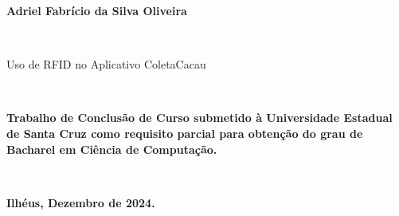 
%
% 
%
\begin{folhadeaprovacao}
\begin{center}
    {\large \begin{large} \bfseries Adriel Fabrício da Silva Oliveira \end{large}\\}
    \vspace{4cm}
    {\large\bfseries{\begin{large}Uso de RFID no Aplicativo ColetaCacau \end{large}}\\}
    \vspace{1cm}
    \hspace{.45\linewidth}
    \begin{minipage}{.50\linewidth}

            \textbf{Trabalho de Conclusão de Curso submetido à Universidade Estadual de Santa Cruz  como requisito parcial 
            para obtenção do grau de Bacharel em Ciência de Computação. }
    \end{minipage}
    \\
\end{center}
    \textbf{Ilhéus, Dezembro de 2024.}
\begin{center}
    \bfseries{}
\end{center}
    \vspace{1cm}
     \setlength{\ABNTEXsignwidth}{10cm}
    \vspace{3 cm}%
\end{folhadeaprovacao}